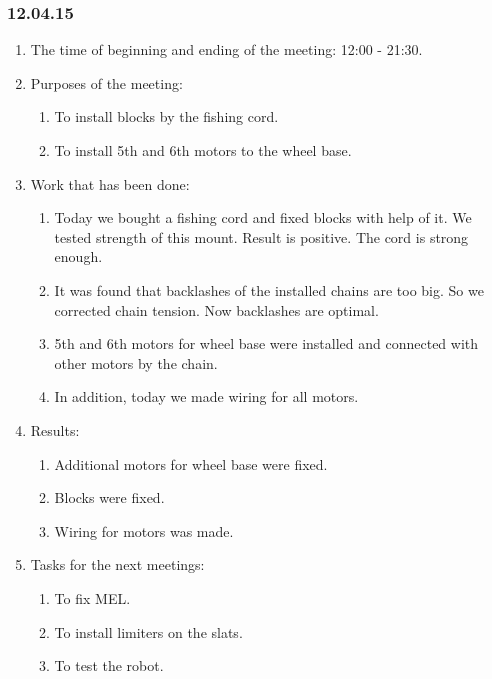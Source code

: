 \subsubsection{12.04.15}
\begin{enumerate}
	
	\item The time of beginning and ending of the meeting: 12:00 - 21:30.
	
	\item Purposes of the meeting: 
	\begin{enumerate}
		
		\item To install blocks by the fishing cord.
		
		\item To install 5th and 6th motors to the wheel base.

	\end{enumerate}

	\item Work that has been done:
	\begin{enumerate}
		
		\item Today we bought a fishing cord and fixed blocks with help of it. We tested strength of this mount. Result is positive. The cord is strong enough.
		
		\item It was found that backlashes of the installed chains are too big. So we corrected chain tension. Now backlashes are optimal.
		
        \item 5th and 6th motors for wheel base were installed and connected with other motors by the chain.
        
        \item In addition, today we made wiring for all motors.

	\end{enumerate}
	
	\item Results:
	\begin{enumerate}
		
		\item Additional motors for wheel base were fixed.
		
		\item Blocks were fixed.
		
        \item Wiring for motors was made.
		
	\end{enumerate}
	
	\item Tasks for the next meetings:
	\begin{enumerate}
		
		\item To fix MEL.
		
		\item To install limiters on the slats.
		
        \item To test the robot.
			
	\end{enumerate}
\end{enumerate}
\fillpage
